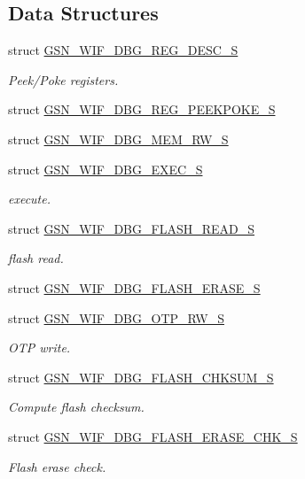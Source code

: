 \subsection*{Data Structures}
\begin{DoxyCompactItemize}
\item 
struct \hyperlink{a00333}{GSN\_\-WIF\_\-DBG\_\-REG\_\-DESC\_\-S}
\begin{DoxyCompactList}\small\item\em Peek/Poke registers. \end{DoxyCompactList}\item 
struct \hyperlink{a00334}{GSN\_\-WIF\_\-DBG\_\-REG\_\-PEEKPOKE\_\-S}
\item 
struct \hyperlink{a00331}{GSN\_\-WIF\_\-DBG\_\-MEM\_\-RW\_\-S}
\item 
struct \hyperlink{a00326}{GSN\_\-WIF\_\-DBG\_\-EXEC\_\-S}
\begin{DoxyCompactList}\small\item\em execute. \end{DoxyCompactList}\item 
struct \hyperlink{a00330}{GSN\_\-WIF\_\-DBG\_\-FLASH\_\-READ\_\-S}
\begin{DoxyCompactList}\small\item\em flash read. \end{DoxyCompactList}\item 
struct \hyperlink{a00329}{GSN\_\-WIF\_\-DBG\_\-FLASH\_\-ERASE\_\-S}
\item 
struct \hyperlink{a00332}{GSN\_\-WIF\_\-DBG\_\-OTP\_\-RW\_\-S}
\begin{DoxyCompactList}\small\item\em OTP write. \end{DoxyCompactList}\item 
struct \hyperlink{a00327}{GSN\_\-WIF\_\-DBG\_\-FLASH\_\-CHKSUM\_\-S}
\begin{DoxyCompactList}\small\item\em Compute flash checksum. \end{DoxyCompactList}\item 
struct \hyperlink{a00328}{GSN\_\-WIF\_\-DBG\_\-FLASH\_\-ERASE\_\-CHK\_\-S}
\begin{DoxyCompactList}\small\item\em Flash erase check. \end{DoxyCompactList}\end{DoxyCompactItemize}
